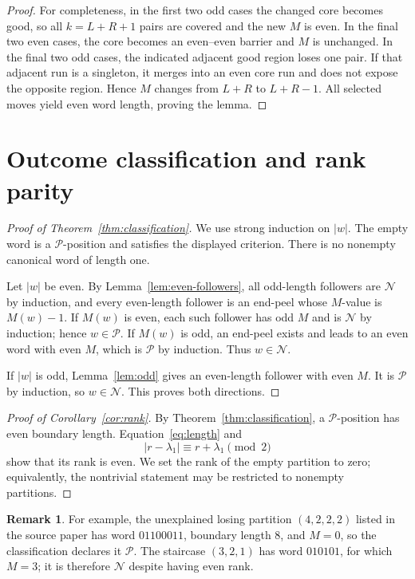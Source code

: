 \documentclass[11pt]{amsart}
\theoremstyle{definition}
\newtheorem{remark}[theorem]{Remark}
\newcommand{\cP}{\mathcal P}
\newcommand{\cN}{\mathcal N}
\begin{document}
\begin{proof}
For completeness, in the first two odd cases the changed core becomes good,
so all $k=L+R+1$ pairs are covered and the new $M$ is even.  In the final two
even cases, the core becomes an even--even barrier and $M$ is unchanged.  In
the final two odd cases, the indicated adjacent good region loses one pair.
If that adjacent run is a singleton, it merges into an even core run and does
not expose the opposite region.  Hence $M$ changes from $L+R$ to $L+R-1$.
All selected moves yield even word length, proving the lemma.
\end{proof}

\section{Outcome classification and rank parity}

\begin{proof}[Proof of Theorem~\ref{thm:classification}]
We use strong induction on $|w|$.  The empty word is a $\cP$-position and
satisfies the displayed criterion.  There is no nonempty canonical word of
length one.

Let $|w|$ be even.  By Lemma~\ref{lem:even-followers}, all odd-length
followers are $\cN$ by induction, and every even-length follower is an
end-peel whose $M$-value is $M(w)-1$.  If $M(w)$ is even, each such follower
has odd $M$ and is $\cN$ by induction; hence $w\in\cP$.  If $M(w)$ is odd,
an end-peel exists and leads to an even word with even $M$, which is $\cP$ by
induction.  Thus $w\in\cN$.

If $|w|$ is odd, Lemma~\ref{lem:odd} gives an even-length follower with even
$M$.  It is $\cP$ by induction, so $w\in\cN$.  This proves both directions.
\end{proof}

\begin{proof}[Proof of Corollary~\ref{cor:rank}]
By Theorem~\ref{thm:classification}, a $\cP$-position has even boundary
length.  Equation~\eqref{eq:length} and
\[
 |r-\lambda_1|\equiv r+\lambda_1\pmod2
\]
show that its rank is even.  We set the rank of the empty partition to zero;
equivalently, the nontrivial statement may be restricted to nonempty
partitions.
\end{proof}

\begin{remark}
For example, the unexplained losing partition $(4,2,2,2)$ listed in the
source paper has word $01100011$, boundary length $8$, and $M=0$, so the
classification declares it $\cP$.  The staircase $(3,2,1)$ has word
$010101$, for which $M=3$; it is therefore $\cN$ despite having even rank.
\end{remark}
\end{document}
